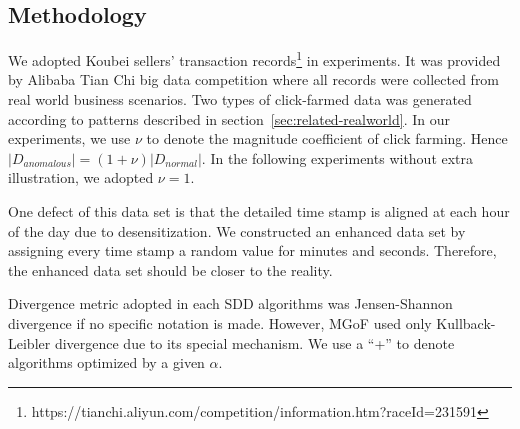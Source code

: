 \documentclass{article}
\begin{document}
		\subsection{Methodology}\label{sec:exp-methodology}
			We adopted Koubei sellers' transaction records\footnote{https://tianchi.aliyun.com/competition/information.htm?raceId=231591} in experiments. It was provided by Alibaba Tian Chi big data competition where all records were collected from real world business scenarios.
			Two types of click-farmed data was generated according to patterns described in section~\ref{sec:related-realworld}.
			In our experiments, we use $\nu$ to denote the magnitude coefficient of click farming. Hence $|D_{anomalous}| = (1 + \nu)|D_{normal}|$. In the following experiments without extra illustration, we adopted $\nu = 1$.
			
			One defect of this data set is that the detailed time stamp is aligned at each hour of the day due to desensitization. We constructed an enhanced data set by assigning every time stamp a random value for minutes and seconds. Therefore, the enhanced data set should be closer to the reality.
			
	
			Divergence metric adopted in each SDD algorithms was Jensen-Shannon divergence if no specific notation is made. However, MGoF used only Kullback-Leibler divergence due to its special mechanism. We use a ``+'' to denote algorithms optimized by a given $\alpha$.
	
\end{document}
